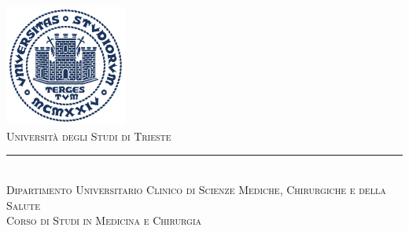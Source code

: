 
\begin{titlepage} %
\null\vfill
\begin{center}
\large
\sffamily
	\newcommand{\HRule}{\rule{\linewidth}{0.5mm}} %
	
	\center %
	
	
	\includegraphics[width=0.3\textwidth]{Figure/logoUniTs_tondo.pdf}\\[1cm] %
	 
	
	
	\textsc{\LARGE Universit\`a degli Studi di Trieste}\\
	\HRule\\[0.5cm] %
	
	\textsc{\Large Dipartimento Universitario Clinico di Scienze Mediche, Chirurgiche e della Salute}\\[0.5cm] %
	
	\textsc{\large Corso di Studi in Medicina e Chirurgia}\\[0.5cm] %
	

\end{center}
\end{titlepage}
